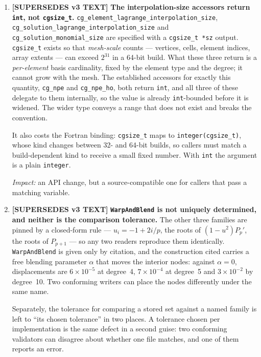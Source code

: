 \documentclass[11pt,letterpaper]{article}
\newif\ifvfourdraft
\newenvironment{v4block}{\ifvfourdraft\color{v4violet}\fi\ignorespaces}{\par}
\newcommand{\SUPERSEDESIV}{\ifvfourdraft
  \textcolor{v4violet}{\textbf{[SUPERSEDES v3 TEXT]}}\else
  \textcolor{clarifybrown}{\textbf{[SUPERSEDES v3 TEXT]}}\fi}
\begin{document}
{\begin{v4block}
\begin{enumerate}[leftmargin=1.4em,itemsep=0.5em]
  \item \SUPERSEDESIV{} \textbf{The interpolation-size accessors return
    \texttt{int}, not \texttt{cgsize\_t}.}
    \texttt{cg\_element\_lagrange\_interpolation\_size},
    \texttt{cg\_solution\_lagrange\_interpolation\_size} and
    \texttt{cg\_solution\_monomial\_size} are specified with a
    \texttt{cgsize\_t *sz} output.  \texttt{cgsize\_t} exists so that
    \emph{mesh-scale} counts --- vertices, cells, element indices, array extents
    --- can exceed $2^{31}$ in a 64-bit build.  What these three return is a
    \emph{per-element} basis cardinality, fixed by the element type and the
    degree; it cannot grow with the mesh.  The established accessors for exactly
    this quantity, \texttt{cg\_npe} and \texttt{cg\_npe\_ho}, both return
    \texttt{int}, and all three of these delegate to them internally, so the
    value is already \texttt{int}-bounded before it is widened.  The wider type
    conveys a range that does not exist and breaks the convention.

    It also costs the Fortran binding: \texttt{cgsize\_t} maps to
    \texttt{integer(cgsize\_t)}, whose kind changes between 32- and 64-bit
    builds, so callers must match a build-dependent kind to receive a small
    fixed number.  With \texttt{int} the argument is a plain \texttt{integer}.

    \textit{Impact:} an API change, but a source-compatible one for callers that
    pass a matching variable.

  \item \SUPERSEDESIV{} \textbf{\texttt{WarpAndBlend} is not uniquely determined,
    and neither is the comparison tolerance.}
    The other three families are pinned by a closed-form rule --- $u_i = -1+2i/p$,
    the roots of $(1-u^2)P_p'$, the roots of $P_{p+1}$ --- so any two readers
    reproduce them identically.  \texttt{WarpAndBlend} is given only by citation,
    and the construction cited carries a free blending parameter $\alpha$ that
    moves the interior nodes: against $\alpha = 0$, displacements are
    $6\times10^{-5}$ at degree~4, $7\times10^{-4}$ at degree~5 and
    $3\times10^{-2}$ by degree~10.  Two conforming writers can place the nodes
    differently under the same name.

    Separately, the tolerance for comparing a stored set against a named family
    is left to ``its chosen tolerance'' in two places.  A tolerance chosen per
    implementation is the same defect in a second guise: two conforming
    validators can disagree about whether one file matches, and one of them
    reports an error.


\end{enumerate}
\end{v4block}}
\end{document}
